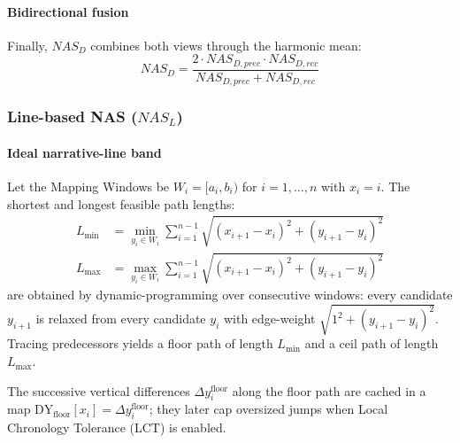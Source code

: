 \documentclass[main.tex]{subfiles}
\begin{document}
\paragraph{Bidirectional fusion}
Finally, $NAS_D$ combines both views through the harmonic mean:
\begin{equation}
NAS_D = \frac{2 \cdot NAS_{D,prec} \cdot NAS_{D,rec}}{NAS_{D,prec} + NAS_{D,rec}}
\end{equation}

\subsubsection{Line-based NAS ($NAS_L$)}

\paragraph{Ideal narrative-line band}
Let the Mapping Windows be $W_i = [a_i, b_i)$ for $i = 1, \ldots, n$ with $x_i = i$. The shortest and longest feasible path lengths:
\begin{align}
L_{\min} &= \min_{y_i \in W_i} \sum_{i=1}^{n-1} \sqrt{(x_{i+1} - x_i)^2 + (y_{i+1} - y_i)^2} \\
L_{\max} &= \max_{y_i \in W_i} \sum_{i=1}^{n-1} \sqrt{(x_{i+1} - x_i)^2 + (y_{i+1} - y_i)^2}
\end{align}
are obtained by dynamic-programming over consecutive windows: every candidate $y_{i+1}$ is relaxed from every candidate $y_i$ with edge-weight $\sqrt{1^2 + (y_{i+1} - y_i)^2}$. Tracing predecessors yields a floor path of length $L_{\min}$ and a ceil path of length $L_{\max}$.

The successive vertical differences $\Delta y_i^{\text{floor}}$ along the floor path are cached in a map $\text{DY}_{\text{floor}}[x_i] = \Delta y_i^{\text{floor}}$; they later cap oversized jumps when Local Chronology Tolerance (LCT) is enabled.
\end{document}
